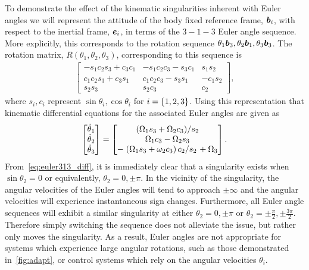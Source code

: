 \documentclass[10pt,fleqn]{IJCAS}  %
\begin{document}
\begin{multicols}{2}
To demonstrate the effect of the kinematic singularities inherent with Euler angles we will represent the attitude of the body fixed reference frame, \( \bm{b}_i \), with respect to the inertial frame, \( \bm{e}_i\), in terms of the \( 3-1-3\) Euler angle sequence.
More explicitly, this corresponds to the rotation sequence \( \theta_1 \bm{b}_3 , \theta_2 \bm{b}_1, \theta_3 \bm{b}_3 \).
The rotation matrix, \( R(\theta_1, \theta_2, \theta_3) \), corresponding to this sequence is 
\begin{align}\label{eq:euler313}
    \begin{bmatrix}
        -s_1 c_2 s_3 + c_3 c_1 & -s_1 c_2 c_3 - s_3 c_1 & s_1s_2 \\
        c_1 c_2 s_3 + c_3 s_1 & c_1 c_2 c_3 - s_3 s_1 & - c_1 s_2 \\
        s_2 s_3 & s_2 c_3 & c_2
    \end{bmatrix} ,
\end{align}
where \( s_i, c_i \) represent \( \sin \theta_i, \cos \theta_i \) for \( i = \left\{ 1,2,3 \right\}\).
Using this representation that kinematic differential equations for the associated Euler angles are given as
\begin{align}\label{eq:euler313_diff}
    \begin{bmatrix}
        \dot{\theta}_1 \\ \dot{\theta}_2 \\ \dot{\theta}_3 
    \end{bmatrix}
    =
    \begin{bmatrix}
        \left.\left( \Omega_1 s_3 + \Omega_2 c_3 \right)\middle/s_2\right. \\
        \Omega_1 c_3 - \Omega_2 s_3 \\
        -\left.\left( \Omega_1 s_3 + \omega_2 c_3 \right)c_2\middle/s_2\right. + \Omega_3
    \end{bmatrix} .
\end{align}
From~\cref{eq:euler313_diff}, it is immediately clear that a singularity exists when \( \sin \theta_2 = 0 \) or equivalently, \( \theta_2 = 0, \pm \pi \). 
In the vicinity of the singularity, the angular velocities of the Euler angles will tend to approach \( \pm \infty \) and the angular velocities will experience instantaneous sign changes.
Furthermore, all Euler angle sequences will exhibit a similar singularity at either \( \theta_2 = 0, \pm \pi \) or \( \theta_2 = \pm \frac{\pi}{2}, \pm \frac{3\pi}{2} \).
Therefore simply switching the sequence does not alleviate the issue, but rather only moves the singularity.
As a result, Euler angles are not appropriate for systems which experience large angular rotations, such as those demonstrated in~\cref{fig:adapt}, or control systems which rely on the angular velocities \( \theta_i \).

\end{multicols}
\end{document}
